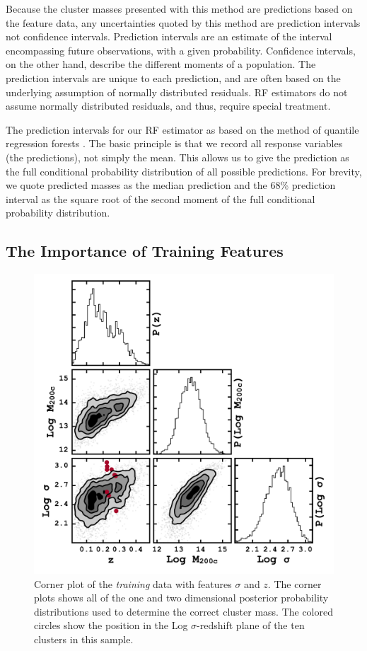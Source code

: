 Because the cluster masses presented with this method are predictions based on the feature data, any uncertainties quoted by this method are prediction intervals not confidence intervals. Prediction intervals are an estimate of the interval encompassing future observations, with a given probability. Confidence intervals, on the other hand, describe the different moments of a population. The prediction intervals are unique to each prediction, and are often based on the underlying assumption of normally distributed residuals. RF estimators do not assume normally distributed residuals, and thus, require special treatment.  

The prediction intervals for our RF estimator as based on the method of quantile regression forests \citep{Meinshausen2006}. The basic principle is that we record all response variables (the predictions), not simply the mean. This allows us to give the prediction as the full conditional probability distribution of all possible predictions. For brevity, we quote predicted masses as the median prediction and the 68\% prediction interval as the square root of the second moment of the full conditional probability distribution.

\subsection{The Importance of Training Features}\label{sec: training features}
\begin{figure}
	\includegraphics[width=\textwidth]{figures2/buzzardCorner.pdf}
	\caption{Corner plot of the \emph{training} data with features $\sigma$ and $z$. The corner plots shows all of the one and two dimensional posterior probability distributions used to determine the correct cluster mass. The colored circles show the position in the Log $\sigma$-redshift plane of the ten clusters in this sample.}
	\label{fig:buzzardCorner}
\end{figure}

